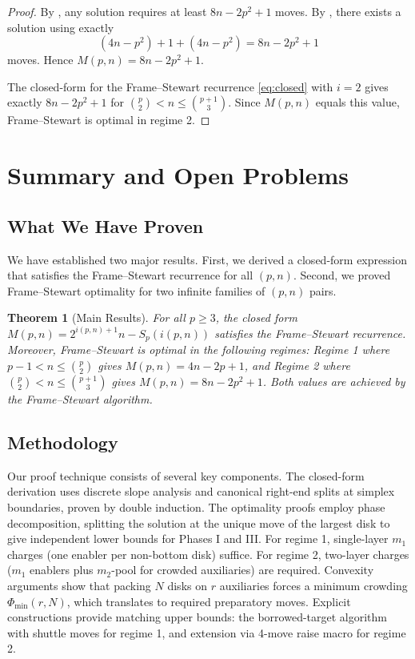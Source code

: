 \documentclass[11pt]{article}
\newtheorem{theorem}{Theorem}
\theoremstyle{definition}
\begin{document}
\begin{proof}
By , any solution requires at least $8n - 2p^2 + 1$ moves. By , there exists a solution using exactly
\[
(4n - p^2) + 1 + (4n - p^2) = 8n - 2p^2 + 1
\]
moves. Hence $M(p,n) = 8n - 2p^2 + 1$.

The closed-form for the Frame--Stewart recurrence \eqref{eq:closed} with $i=2$ gives exactly $8n - 2p^2 + 1$ for $\binom{p}{2} < n \leq \binom{p+1}{3}$. Since $M(p,n)$ equals this value, Frame--Stewart is optimal in regime 2.
\end{proof}

\section{Summary and Open Problems}

\subsection{What We Have Proven}

We have established two major results. First, we derived a closed-form expression that satisfies the Frame--Stewart recurrence for all $(p,n)$. Second, we proved Frame--Stewart optimality for two infinite families of $(p,n)$ pairs.

\begin{theorem}[Main Results]
For all $p \geq 3$, the closed form $M(p,n) = 2^{i(p,n)+1}n - S_p(i(p,n))$ satisfies the Frame--Stewart recurrence. Moreover, Frame--Stewart is optimal in the following regimes: Regime 1 where $p-1 < n \leq \binom{p}{2}$ gives $M(p,n) = 4n - 2p + 1$, and Regime 2 where $\binom{p}{2} < n \leq \binom{p+1}{3}$ gives $M(p,n) = 8n - 2p^2 + 1$. Both values are achieved by the Frame--Stewart algorithm.
\end{theorem}

\subsection{Methodology}

Our proof technique consists of several key components. The closed-form derivation uses discrete slope analysis and canonical right-end splits at simplex boundaries, proven by double induction. The optimality proofs employ phase decomposition, splitting the solution at the unique move of the largest disk to give independent lower bounds for Phases I and III. For regime 1, single-layer $m_1$ charges (one enabler per non-bottom disk) suffice. For regime 2, two-layer charges ($m_1$ enablers plus $m_2$-pool for crowded auxiliaries) are required. Convexity arguments show that packing $N$ disks on $r$ auxiliaries forces a minimum crowding $\Phi_{\min}(r,N)$, which translates to required preparatory moves. Explicit constructions provide matching upper bounds: the borrowed-target algorithm with shuttle moves for regime 1, and extension via 4-move raise macro for regime 2.
\end{document}
